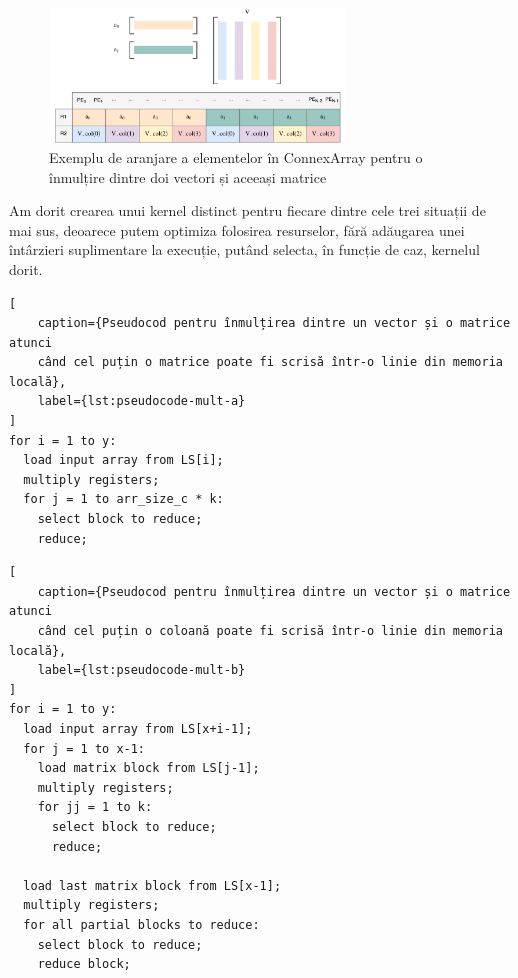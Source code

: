 \begin{figure}[h]
    \centering
    \includegraphics[width=0.7\textwidth]{src/img/vec-matrix-more-mult}
    \caption{Exemplu de aranjare a elementelor în ConnexArray pentru o înmulțire
    dintre doi vectori și aceeași matrice}
    \label{fig:cnx-more-mult}
\end{figure}

Am dorit crearea unui kernel distinct pentru fiecare dintre cele trei
situații de mai sus, deoarece putem optimiza folosirea resurselor, fără
adăugarea unei întârzieri suplimentare la execuție, putând selecta, în funcție
de caz, kernelul dorit.

\begin{lstlisting}[
    caption={Pseudocod pentru înmulțirea dintre un vector și o matrice atunci
    când cel puțin o matrice poate fi scrisă într-o linie din memoria locală},
    label={lst:pseudocode-mult-a}
]
for i = 1 to y:
  load input array from LS[i];
  multiply registers;
  for j = 1 to arr_size_c * k:
    select block to reduce;
    reduce;
\end{lstlisting}

\begin{lstlisting}[
    caption={Pseudocod pentru înmulțirea dintre un vector și o matrice atunci
    când cel puțin o coloană poate fi scrisă într-o linie din memoria locală},
    label={lst:pseudocode-mult-b}
]
for i = 1 to y:
  load input array from LS[x+i-1];
  for j = 1 to x-1:
    load matrix block from LS[j-1];
    multiply registers;
    for jj = 1 to k:
      select block to reduce;
      reduce;

  load last matrix block from LS[x-1];
  multiply registers;
  for all partial blocks to reduce:
    select block to reduce;
    reduce block;
\end{lstlisting}

